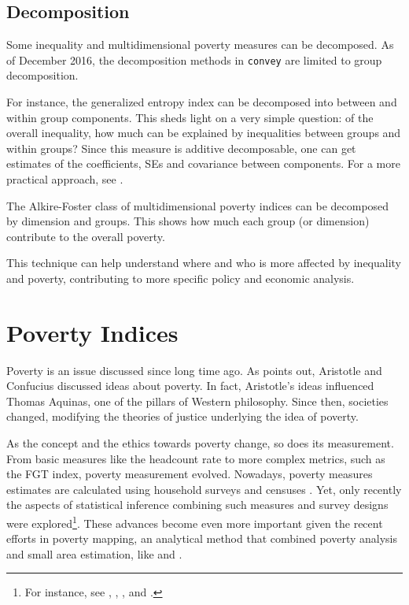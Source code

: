 \documentclass[]{book}
\begin{document}
\hypertarget{decomposition}{%
\section{Decomposition}\label{decomposition}}

Some inequality and multidimensional poverty measures can be decomposed. As of December 2016, the decomposition methods in \texttt{convey} are limited to group decomposition.

For instance, the generalized entropy index can be decomposed into between and within group components. This sheds light on a very simple question: of the overall inequality, how much can be explained by inequalities between groups and within groups? Since this measure is additive decomposable, one can get estimates of the coefficients, SEs and covariance between components. For a more practical approach, see \citep{lima2013}.

The Alkire-Foster class of multidimensional poverty indices can be decomposed by dimension and groups. This shows how much each group (or dimension) contribute to the overall poverty.

This technique can help understand where and who is more affected by inequality and poverty, contributing to more specific policy and economic analysis.

\hypertarget{poverty}{%
\chapter{Poverty Indices}\label{poverty}}

Poverty is an issue discussed since long time ago. As \citet{ravallion2016} points out, Aristotle and Confucius discussed ideas about poverty. In fact, Aristotle's ideas influenced Thomas Aquinas, one of the pillars of Western philosophy. Since then, societies changed, modifying the theories of justice underlying the idea of poverty.

As the concept and the ethics towards poverty change, so does its measurement. From basic measures like the headcount rate to more complex metrics, such as the FGT index, poverty measurement evolved. Nowadays, poverty measures estimates are calculated using household surveys and censuses \citep{deaton1997}. Yet, only recently the aspects of statistical inference combining such measures and survey designs were explored\footnote{For instance, see \citet{deville1999}, \citet{berger2003}, \citet{bhat2007}, and \citet{osier2009}.}. These advances become even more important given the recent efforts in poverty mapping, an analytical method that combined poverty analysis and small area estimation, like \citet{elbers2003} and \citet{bedi2007}.
\end{document}
